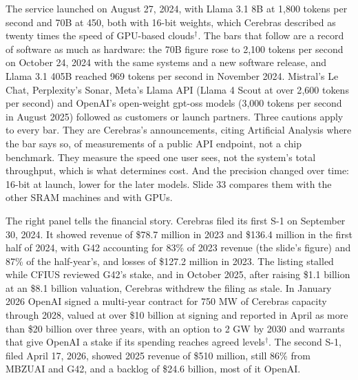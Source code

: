 \documentclass[11pt,letterpaper]{article}
\begin{document}
The service launched on August 27, 2024, with Llama 3.1 8B at 1{,}800 tokens per second and 70B at 450, both with 16-bit weights, which Cerebras described as twenty times the speed of GPU-based clouds$^\dagger$. The bars that follow are a record of software as much as hardware: the 70B figure rose to 2{,}100 tokens per second on October 24, 2024 with the same systems and a new software release, and Llama 3.1 405B reached 969 tokens per second in November 2024. Mistral's Le Chat, Perplexity's Sonar, Meta's Llama API (Llama 4 Scout at over 2{,}600 tokens per second) and OpenAI's open-weight gpt-oss models (3{,}000 tokens per second in August 2025) followed as customers or launch partners. Three cautions apply to every bar. They are Cerebras's announcements, citing Artificial Analysis where the bar says so, of measurements of a public API endpoint, not a chip benchmark. They measure the speed one user sees, not the system's total throughput, which is what determines cost. And the precision changed over time: 16-bit at launch, lower for the later models. Slide 33 compares them with the other SRAM machines and with GPUs.

The right panel tells the financial story. Cerebras filed its first S-1 on September 30, 2024. It showed revenue of \$78.7 million in 2023 and \$136.4 million in the first half of 2024, with G42 accounting for 83\% of 2023 revenue (the slide's figure) and 87\% of the half-year's, and losses of \$127.2 million in 2023. The listing stalled while CFIUS reviewed G42's stake, and in October 2025, after raising \$1.1 billion at an \$8.1 billion valuation, Cerebras withdrew the filing as stale. In January 2026 OpenAI signed a multi-year contract for 750 MW of Cerebras capacity through 2028, valued at over \$10 billion at signing and reported in April as more than \$20 billion over three years, with an option to 2 GW by 2030 and warrants that give OpenAI a stake if its spending reaches agreed levels$^\dagger$. The second S-1, filed April 17, 2026, showed 2025 revenue of \$510 million, still 86\% from MBZUAI and G42, and a backlog of \$24.6 billion, most of it OpenAI.
\end{document}
